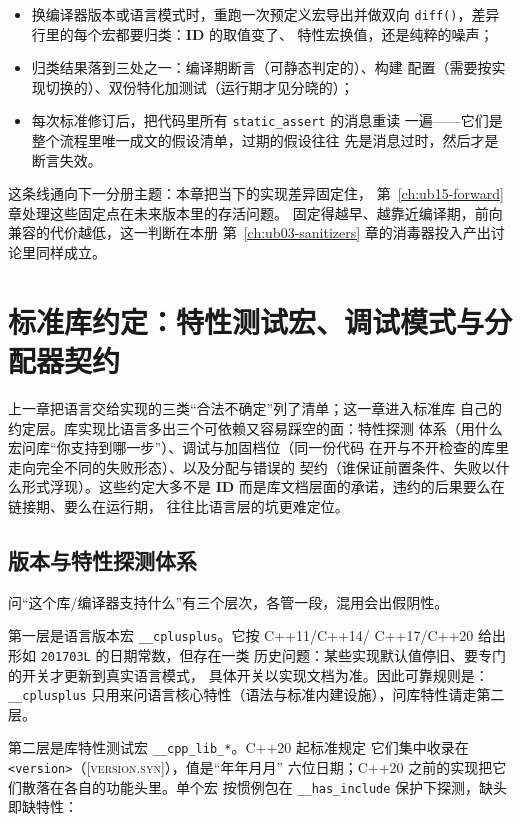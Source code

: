 \documentclass[12pt,a4paper,fontset=fandol]{ctexbook}
\newcommand{\cpp}[1]{C++#1}
\newcommand{\Fn}[1]{\texttt{#1()}}
\newcommand{\Tp}[1]{\texttt{#1}}
\newcommand{\IDB}{\textbf{\textsf{ID}}}
\newcommand{\Std}[1]{\textsc{[#1]}}
\newcommand{\Hdr}[1]{\texttt{<#1>}}
\newcommand{\Feat}[1]{\texttt{#1}}
\begin{document}
\begin{itemize}
\item 换编译器版本或语言模式时，重跑一次预定义宏导出并做双向
    \Fn{diff}，差异行里的每个宏都要归类：\IDB{} 的取值变了、
    特性宏换值，还是纯粹的噪声；
\item 归类结果落到三处之一：编译期断言（可静态判定的）、构建
    配置（需要按实现切换的）、双份特化加测试（运行期才见分晓的）；
\item 每次标准修订后，把代码里所有 \Tp{static\_assert} 的消息重读
    一遍——它们是整个流程里唯一成文的假设清单，过期的假设往往
    先是消息过时，然后才是断言失效。
\end{itemize}

这条线通向下一分册主题：本章把当下的实现差异固定住，
第~\ref{ch:ub15-forward} 章处理这些固定点在未来版本里的存活问题。
固定得越早、越靠近编译期，前向兼容的代价越低，这一判断在本册
第~\ref{ch:ub03-sanitizers} 章的消毒器投入产出讨论里同样成立。

\chapter{标准库约定：特性测试宏、调试模式与分配器契约}\label{ch:ub14-conventions}

上一章把语言交给实现的三类“合法不确定”列了清单；这一章进入标准库
自己的约定层。库实现比语言多出三个可依赖又容易踩空的面：特性探测
体系（用什么宏问库“你支持到哪一步”）、调试与加固档位（同一份代码
在开与不开检查的库里走向完全不同的失败形态）、以及分配与错误的
契约（谁保证前置条件、失败以什么形式浮现）。这些约定大多不是
\IDB{} 而是库文档层面的承诺，违约的后果要么在链接期、要么在运行期，
往往比语言层的坑更难定位。

\section{版本与特性探测体系}\label{sec:ub14-feature-detection}

问“这个库/编译器支持什么”有三个层次，各管一段，混用会出假阴性。

第一层是语言版本宏 \Feat{\_\_cplusplus}。它按 \cpp{11}/\cpp{14}/
\cpp{17}/\cpp{20} 给出形如 \Tp{201703L} 的日期常数，但存在一类
历史问题：某些实现默认值停旧、要专门的开关才更新到真实语言模式，
具体开关以实现文档为准。因此可靠规则是：\Feat{\_\_cplusplus}
只用来问语言核心特性（语法与标准内建设施），问库特性请走第二层。

第二层是库特性测试宏 \Feat{\_\_cpp\_lib\_*}。\cpp{20} 起标准规定
它们集中收录在 \Hdr{version}（\Std{version.syn}），值是“年年月月”
六位日期；\cpp{20} 之前的实现把它们散落在各自的功能头里。单个宏
按惯例包在 \Feat{\_\_has\_include} 保护下探测，缺头即缺特性：
\end{document}
